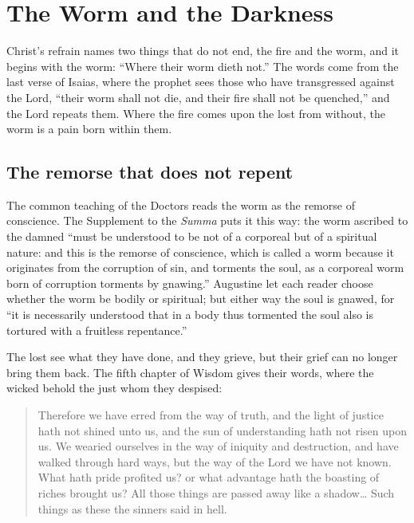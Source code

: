 \section{The Worm and the Darkness}

Christ's refrain names two things that do not end, the fire and the worm, and it begins with the worm: ``Where their worm dieth not.'' The words come from the last verse of Isaias, where the prophet sees those who have transgressed against the Lord, ``their worm shall not die, and their fire shall not be quenched,'' and the Lord repeats them. Where the fire comes upon the lost from without, the worm is a pain born within them.

\subsection{The remorse that does not repent}

The common teaching of the Doctors reads the worm as the remorse of conscience. The Supplement to the \emph{Summa} puts it this way: the worm ascribed to the damned ``must be understood to be not of a corporeal but of a spiritual nature: and this is the remorse of conscience, which is called a worm because it originates from the corruption of sin, and torments the soul, as a corporeal worm born of corruption torments by gnawing.'' Augustine let each reader choose whether the worm be bodily or spiritual; but either way the soul is gnawed, for ``it is necessarily understood that in a body thus tormented the soul also is tortured with a fruitless repentance.''

The lost see what they have done, and they grieve, but their grief can no longer bring them back. The fifth chapter of Wisdom gives their words, where the wicked behold the just whom they despised:

\begin{quote}
Therefore we have erred from the way of truth, and the light of justice hath not shined unto us, and the sun of understanding hath not risen upon us. We wearied ourselves in the way of iniquity and destruction, and have walked through hard ways, but the way of the Lord we have not known. What hath pride profited us? or what advantage hath the boasting of riches brought us? All those things are passed away like a shadow\ldots{} Such things as these the sinners said in hell.
\end{quote}

